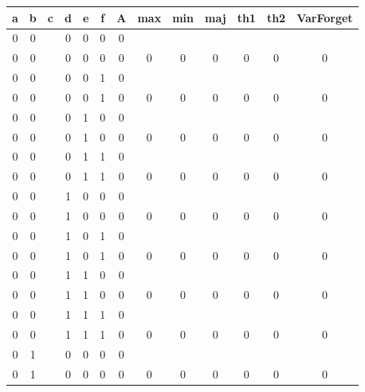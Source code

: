 \begin{table}[!tb]
    \centering
    \begin{tabular}{|c|c|c|c|c|c|c|c|c|c|c|c|c|}
        \hline
        \textbf{a} & \textbf{b} & \textbf{c} & \textbf{d} & \textbf{e} & \textbf{f} & \textbf{A} & \textbf{max} & \textbf{min} & \textbf{maj} & \textbf{th1} & \textbf{th2} & \textbf{VarForget} \\ \hline
        \rowcolor{gray!40} 0 & 0 &  & 0 & 0 & 0 & 0 &  &  &  &  &  &  \\ \hline
        \rowcolor{gray!40} 0 & 0 &  & 0 & 0 & 0 & 0 & 0 & 0 & 0 & 0 & 0 & 0 \\ \hline
        \rowcolor{blue!40} 0 & 0 &  & 0 & 0 & 1 & 0 &  &  &  &  &  &  \\ \hline
        \rowcolor{blue!40} 0 & 0 &  & 0 & 0 & 1 & 0 & 0 & 0 & 0 & 0 & 0 & 0 \\ \hline
        \rowcolor{red!40} 0 & 0 &  & 0 & 1 & 0 & 0 &  &  &  &  &  &  \\ \hline
        \rowcolor{red!40} 0 & 0 &  & 0 & 1 & 0 & 0 & 0 & 0 & 0 & 0 & 0 & 0 \\ \hline
        \rowcolor{green!40} 0 & 0 &  & 0 & 1 & 1 & 0 &  &  &  &  &  &  \\ \hline
        \rowcolor{green!40} 0 & 0 &  & 0 & 1 & 1 & 0 & 0 & 0 & 0 & 0 & 0 & 0 \\ \hline
        \rowcolor{yellow!40} 0 & 0 &  & 1 & 0 & 0 & 0 &  &  &  &  &  &  \\ \hline
        \rowcolor{yellow!40} 0 & 0 &  & 1 & 0 & 0 & 0 & 0 & 0 & 0 & 0 & 0 & 0 \\ \hline
        \rowcolor{gray!40} 0 & 0 &  & 1 & 0 & 1 & 0 &  &  &  &  &  &  \\ \hline
        \rowcolor{gray!40} 0 & 0 &  & 1 & 0 & 1 & 0 & 0 & 0 & 0 & 0 & 0 & 0 \\ \hline
        \rowcolor{blue!40} 0 & 0 &  & 1 & 1 & 0 & 0 &  &  &  &  &  &  \\ \hline
        \rowcolor{blue!40} 0 & 0 &  & 1 & 1 & 0 & 0 & 0 & 0 & 0 & 0 & 0 & 0 \\ \hline
        \rowcolor{red!40} 0 & 0 &  & 1 & 1 & 1 & 0 &  &  &  &  &  &  \\ \hline
        \rowcolor{red!40} 0 & 0 &  & 1 & 1 & 1 & 0 & 0 & 0 & 0 & 0 & 0 & 0 \\ \hline
        \rowcolor{green!40} 0 & 1 &  & 0 & 0 & 0 & 0 &  &  &  &  &  &  \\ \hline
        \rowcolor{green!40} 0 & 1 &  & 0 & 0 & 0 & 0 & 0 & 0 & 0 & 0 & 0 & 0 \\ \hline

\end{tabular}
\end{table}
